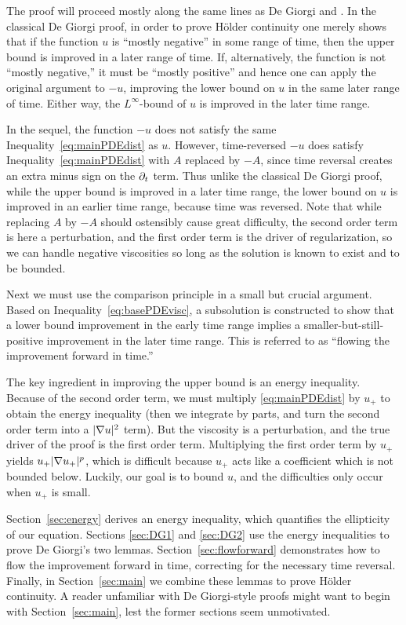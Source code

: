 The proof will proceed mostly along the same lines as De Giorgi \cite{DG} and \cite{ChVa}.  In the classical De Giorgi proof, in order to prove H\"{o}lder continuity one merely shows that if the function $u$ is ``mostly negative'' in some range of time, then the upper bound is improved in a later range of time.  If, alternatively, the function is not ``mostly negative,'' it must be ``mostly positive'' and hence one can apply the original argument to $-u$, improving the lower bound on $u$ in the same later range of time.  Either way, the $L^\infty$-bound of $u$ is improved in the later time range.  

In the sequel, the function $-u$ does not satisfy the same Inequality~\eqref{eq:mainPDEdist} as $u$.  However, time-reversed $-u$ does satisfy Inequality~\eqref{eq:mainPDEdist} with $A$ replaced by $-A$, since time reversal creates an extra minus sign on the $\partial_t$ term. Thus unlike the classical De Giorgi proof, while the upper bound is improved in a later time range, the lower bound on $u$ is improved in an earlier time range, because time was reversed.  Note that while replacing $A$ by $-A$ should ostensibly cause great difficulty, the second order term is here a perturbation, and the first order term is the driver of regularization, so we can handle negative viscosities so long as the solution is known to exist and to be bounded.  

Next we must use the comparison principle in a small but crucial argument.  Based on Inequality~\eqref{eq:basePDEvisc}, a subsolution is constructed to show that a lower bound improvement in the early time range implies a smaller-but-still-positive improvement in the later time range.  This is referred to as ``flowing the improvement forward in time.''  

The key ingredient in improving the upper bound is an energy inequality.  Because of the second order term, we must multiply \eqref{eq:mainPDEdist} by $u_+$ to obtain the energy inequality (then we integrate by parts, and turn the second order term into a $|\nabla u|^2$ term).  But the viscosity is a perturbation, and the true driver of the proof is the first order term.  Multiplying the first order term by $u_+$ yields $u_+ |\nabla u_+|^p$, which is difficult because $u_+$ acts like a coefficient which is not bounded below.  Luckily, our goal is to bound $u$, and the difficulties only occur when $u_+$ is small.    

Section~\ref{sec:energy} derives an energy inequality, which quantifies the ellipticity of our equation.  Sections \ref{sec:DG1} and \ref{sec:DG2}  use the energy inequalities to prove De Giorgi's two lemmas.  Section~\ref{sec:flowforward} demonstrates how to flow the improvement forward in time, correcting for the necessary time reversal.  Finally, in Section~\ref{sec:main} we combine these lemmas to prove H\"{o}lder continuity.  A reader unfamiliar with De Giorgi-style proofs might want to begin with Section~\ref{sec:main}, lest the former sections seem unmotivated.  


